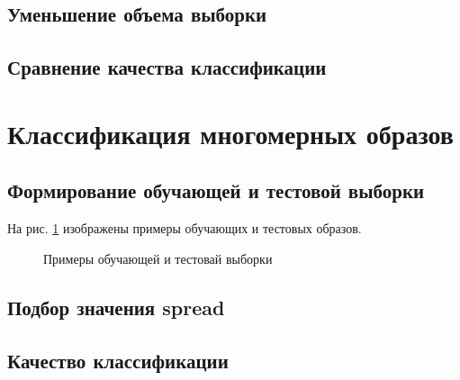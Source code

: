 \subsection{Уменьшение объема выборки}


\subsection{Сравнение качества классификации}


\newpage

\section{Классификация многомерных образов}

\subsection{Формирование обучающей и тестовой выборки}


На рис. \ref{fig:5_1} изображены примеры обучающих и тестовых образов.
\begin{figure}[H]
\begin{center}
	\caption{Примеры обучающей и тестовай выборки}
	\label{fig:5_1}
\end{center}
\end{figure}

\subsection{Подбор значения spread}


\subsection{Качество классификации}

